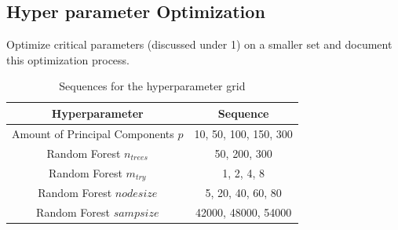 \documentclass[conference]{IEEEtran}
\begin{document}
\subsection{Hyper parameter Optimization}
Optimize critical parameters (discussed under 1) on a smaller set and document this optimization process.

\begin{table}[htbp]
    \color{til}
    \caption{\color{til}Sequences for the hyperparameter grid}
    \begin{center}
    \begin{tabular}{|c|c|}
        \hline
        \textbf{Hyperparameter} & \textbf{Sequence} \\
        \hline
        Amount of Principal Components $p$ & 10, 50, 100, 150, 300\\
        \hline
        Random Forest $n_{trees}$ & 50, 200, 300\\
        \hline
        Random Forest $m_{try}$ & 1, 2, 4, 8\\
        \hline
        Random Forest ${nodesize}$ & 5, 20, 40, 60, 80\\
        \hline
        Random Forest ${sampsize}$ & 42000, 48000, 54000\\
        \hline
    \end{tabular}
    \label{table:hyperParamGrid}
    \end{center}
\end{table}
\end{document}
